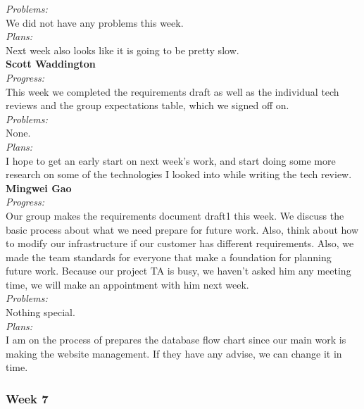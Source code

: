 \noindent\textit{Problems:}\\
\noindent We did not have any problems this week.\\

\noindent\textit{Plans:}\\
\noindent Next week also looks like it is going to be pretty slow.\\

\noindent\textbf{Scott Waddington}\\
\noindent\textit{Progress:}\\
This week we completed the requirements draft as well as the individual tech reviews and the group expectations table, which we signed off on.\\

\noindent\textit{Problems:}\\
\noindent None.\\

\noindent\textit{Plans:}\\
\noindent I hope to get an early start on next week's work, and start doing some more research on some of the technologies I looked into while writing the tech review.\\

\noindent\textbf{Mingwei Gao}\\
\noindent\textit{Progress:}\\
 Our group makes the requirements document draft1 this week. We discuss the basic process about what we need prepare for future work. Also, think about how to modify our infrastructure if our customer has different requirements. Also, we made the team standards for everyone that make a foundation for planning future work. Because our project TA is busy, we haven't asked him any meeting time, we will make an appointment with him next week.\\

\noindent\textit{Problems:}\\
\noindent Nothing special.\\

\noindent\textit{Plans:}\\
\noindent  I am on the process of prepares the database flow chart since our main work is making the website management. If they have any advise, we can change it in time.\\

\subsubsection{Week 7}

